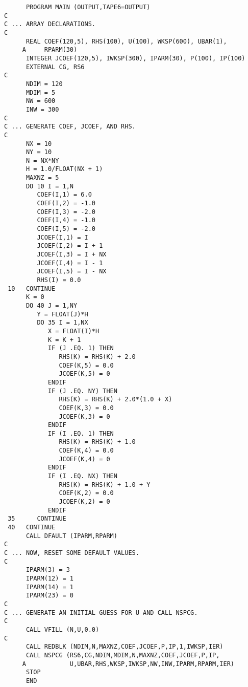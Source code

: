 \begin{verbatim}
      PROGRAM MAIN (OUTPUT,TAPE6=OUTPUT)
C
C ... ARRAY DECLARATIONS.
C
      REAL COEF(120,5), RHS(100), U(100), WKSP(600), UBAR(1),
     A     RPARM(30)
      INTEGER JCOEF(120,5), IWKSP(300), IPARM(30), P(100), IP(100)
      EXTERNAL CG, RS6
C
      NDIM = 120
      MDIM = 5
      NW = 600
      INW = 300
C
C ... GENERATE COEF, JCOEF, AND RHS.
C
      NX = 10
      NY = 10
      N = NX*NY
      H = 1.0/FLOAT(NX + 1)
      MAXNZ = 5
      DO 10 I = 1,N 
         COEF(I,1) = 6.0
         COEF(I,2) = -1.0
         COEF(I,3) = -2.0
         COEF(I,4) = -1.0
         COEF(I,5) = -2.0
         JCOEF(I,1) = I
         JCOEF(I,2) = I + 1
         JCOEF(I,3) = I + NX
         JCOEF(I,4) = I - 1
         JCOEF(I,5) = I - NX
         RHS(I) = 0.0
 10   CONTINUE
      K = 0
      DO 40 J = 1,NY
         Y = FLOAT(J)*H
         DO 35 I = 1,NX
            X = FLOAT(I)*H
            K = K + 1
            IF (J .EQ. 1) THEN
               RHS(K) = RHS(K) + 2.0
               COEF(K,5) = 0.0
               JCOEF(K,5) = 0 
            ENDIF
            IF (J .EQ. NY) THEN
               RHS(K) = RHS(K) + 2.0*(1.0 + X)
               COEF(K,3) = 0.0
               JCOEF(K,3) = 0 
            ENDIF
            IF (I .EQ. 1) THEN
               RHS(K) = RHS(K) + 1.0
               COEF(K,4) = 0.0
               JCOEF(K,4) = 0 
            ENDIF
            IF (I .EQ. NX) THEN
               RHS(K) = RHS(K) + 1.0 + Y
               COEF(K,2) = 0.0
               JCOEF(K,2) = 0 
            ENDIF
 35      CONTINUE
 40   CONTINUE
      CALL DFAULT (IPARM,RPARM)
C
C ... NOW, RESET SOME DEFAULT VALUES.
C
      IPARM(3) = 3
      IPARM(12) = 1 
      IPARM(14) = 1 
      IPARM(23) = 0 
C
C ... GENERATE AN INITIAL GUESS FOR U AND CALL NSPCG.
C
      CALL VFILL (N,U,0.0)
C
      CALL REDBLK (NDIM,N,MAXNZ,COEF,JCOEF,P,IP,1,IWKSP,IER)
      CALL NSPCG (RS6,CG,NDIM,MDIM,N,MAXNZ,COEF,JCOEF,P,IP, 
     A            U,UBAR,RHS,WKSP,IWKSP,NW,INW,IPARM,RPARM,IER)
      STOP
      END 
\end{verbatim}
\newpage
